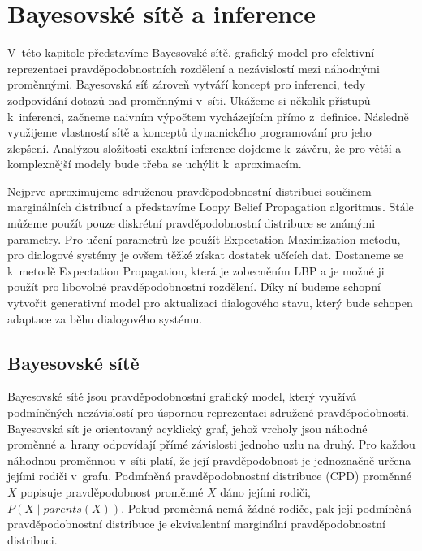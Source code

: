 \chapter{Bayesovské sítě a inference}
\label{ch:kap2}

V~této kapitole představíme Bayesovské sítě, grafický model pro efektivní reprezentaci pravděpodobnostních rozdělení a nezávislostí mezi náhodnými proměnnými.
Bayesovská síť zároveň vytváří koncept pro inferenci, tedy zodpovídání dotazů nad proměnnými v~síti.
Ukážeme si několik přístupů k~inferenci, začneme naivním výpočtem vycházejícím přímo z~definice.
Následně využijeme vlastností sítě a konceptů dynamického programování pro jeho zlepšení.
Analýzou složitosti exaktní inference dojdeme k~závěru, že pro větší a komplexnější modely bude třeba se uchýlit k~aproximacím.

Nejprve aproximujeme sdruženou pravděpodobnostní distribuci součinem marginálních distribucí a představíme Loopy Belief Propagation algoritmus.
Stále můžeme použít pouze diskrétní pravděpodobnostní distribuce se známými parametry.
Pro učení parametrů lze použít Expectation Maximization metodu, pro dialogové systémy je ovšem těžké získat dostatek učících dat.
Dostaneme se k~metodě Expectation Propagation, která je zobecněním LBP a je možné ji použít pro libovolné pravděpodobnostní rozdělení.
Díky ní budeme schopní vytvořit generativní model pro aktualizaci dialogového stavu, který bude schopen adaptace za běhu dialogového systému.

\section{Bayesovské sítě}
\label{sec:bn}

Bayesovské sítě jsou pravděpodobnostní grafický model, který využívá podmíněných nezávislostí pro úspornou reprezentaci sdružené pravděpodobnosti.
Bayesovská sít je orientovaný acyklický graf, jehož vrcholy jsou náhodné proměnné a~hrany odpovídají přímé závislosti jednoho uzlu na druhý.
Pro každou náhodnou proměnnou v~síti platí, že její pravděpodobnost je jednoznačně určena jejími rodiči v~grafu.
Podmíněná pravděpodobnostní distribuce (CPD) proměnné $X$ popisuje pravděpodobnost proměnné $X$ dáno jejími rodiči, $P(X \mid parents(X))$.
Pokud proměnná nemá žádné rodiče, pak její podmíněná pravděpodobnostní distribuce je ekvivalentní marginální pravděpodobnostní distribuci.

